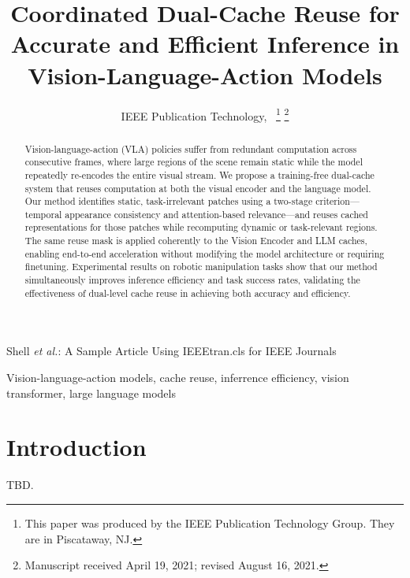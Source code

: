 \documentclass[lettersize,journal]{IEEEtran}
\begin{document}
\title{Coordinated Dual-Cache Reuse for Accurate and Efficient Inference in Vision-Language-Action Models}

\author{IEEE Publication Technology,~
\thanks{This paper was produced by the IEEE Publication Technology Group. They are in Piscataway, NJ.}%
\thanks{Manuscript received April 19, 2021; revised August 16, 2021.}}

%
{Shell \MakeLowercase{\textit{et al.}}: A Sample Article Using IEEEtran.cls for IEEE Journals}


\maketitle

\begin{abstract}
Vision-language-action (VLA) policies suffer from redundant computation across consecutive frames, where large regions of the scene remain static while the model repeatedly re-encodes the entire visual stream. We propose a training-free dual-cache system that reuses computation at both the visual encoder and the language model. Our method identifies static, task-irrelevant patches using a two-stage criterion---temporal appearance consistency and attention-based relevance---and reuses cached representations for those patches while recomputing dynamic or task-relevant regions. The same reuse mask is applied coherently to the Vision Encoder and LLM caches, enabling end-to-end acceleration without modifying the model architecture or requiring finetuning. Experimental results on robotic manipulation tasks show that our method simultaneously improves inference efficiency and task success rates, validating the effectiveness of dual-level cache reuse in achieving both accuracy and efficiency.
\end{abstract}

\begin{IEEEkeywords}
Vision-language-action models, cache reuse, inferrence efficiency, vision transformer, large language models
\end{IEEEkeywords}

\section{Introduction}
TBD.
\end{document}
